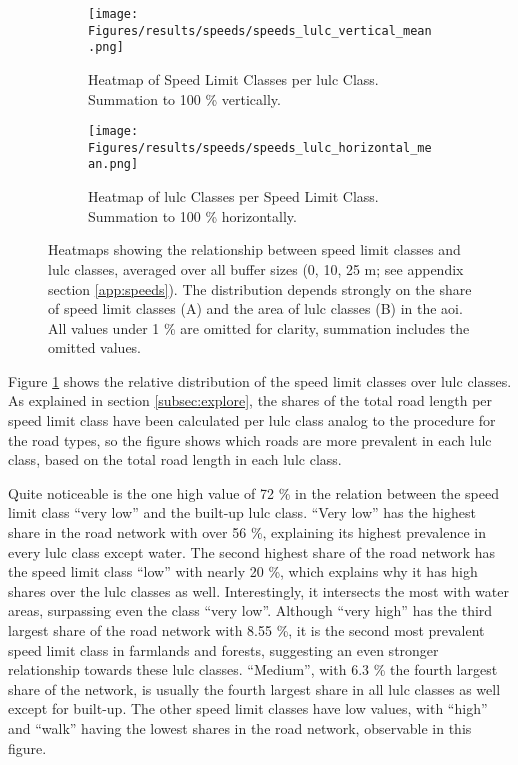 \begin{figure}[htb]
    \centering
    \begin{subfigure}{.465\textwidth}
        \centering
        \texttt{[image: Figures/results/speeds/speeds\_lulc\_vertical\_mean.png]}
        \caption{Heatmap of Speed Limit Classes per \gls{lulc} Class.\\Summation to 100 \% vertically.}
        \label{fig:speeds_v_mean}
    \end{subfigure}
    \begin{subfigure}{.525\textwidth}
        \centering
        \texttt{[image: Figures/results/speeds/speeds\_lulc\_horizontal\_mean.png]}
        \caption{Heatmap of \gls{lulc} Classes per Speed Limit Class.\\Summation to 100 \% horizontally.}
        \label{fig:speeds_h_mean}
    \end{subfigure}
    \caption[Averaged Heatmaps of Speed Limit Classes vs.  Classes]{Heatmaps showing the relationship between speed limit classes and \gls{lulc} classes, averaged over all buffer sizes (0, 10, 25 m; see appendix section \ref{app:speeds}). The distribution depends strongly on the share of speed limit classes (A) and the area of \gls{lulc} classes (B) in the \gls{aoi}. All values under 1 \% are omitted for clarity, summation includes the omitted values.}
    \label{fig:speeds_mean}
\end{figure}

Figure \ref{fig:speeds_v_mean} shows the relative distribution of the speed limit classes over \gls{lulc} classes. As explained in section \ref{subsec:explore}, the shares of the total road length per speed limit class have been calculated per \gls{lulc} class analog to the procedure for the road types, so the figure shows which roads are more prevalent in each \gls{lulc} class, based on the total road length in each \gls{lulc} class.

Quite noticeable is the one high value of 72 \% in the relation between the speed limit class \enquote{very low} and the built-up \gls{lulc} class. \enquote{Very low} has the highest share in the road network with over 56 \%, explaining its highest prevalence in every \gls{lulc} class except water. The second highest share of the road network has the speed limit class \enquote{low} with nearly 20 \%, which explains why it has high shares over the \gls{lulc} classes as well. Interestingly, it intersects the most with water areas, surpassing even the class \enquote{very low}. Although \enquote{very high} has the third largest share of the road network with 8.55 \%, it is the second most prevalent speed limit class in farmlands and forests, suggesting an even stronger relationship towards these \gls{lulc} classes. \enquote{Medium}, with 6.3 \% the fourth largest share of the network, is usually the fourth largest share in all \gls{lulc} classes as well except for built-up. The other speed limit classes have low values, with \enquote{high} and \enquote{walk} having the lowest shares in the road network, observable in this figure.

